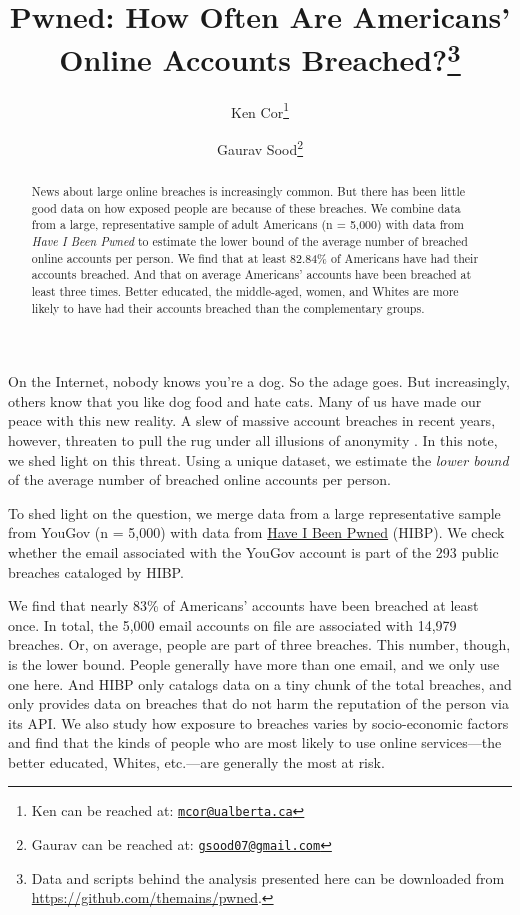 \documentclass[12pt, letterpaper]{article}
\title{Pwned: How Often Are Americans' Online Accounts Breached?\footnote{Data and scripts behind the analysis presented here can be downloaded from \url{https://github.com/themains/pwned}.
}}
\author{Ken Cor\thanks{Ken can be reached at: \href{mailto:mcor@ualberta.ca}{\texttt{mcor@ualberta.ca}}} \and Gaurav Sood\thanks{Gaurav can be reached at: \href{gsood07@gmail.com}{\texttt{gsood07@gmail.com}}}}
\begin{document}
\maketitle
\thispagestyle{empty}

\begin{abstract}
News about large online breaches is increasingly common. But there has been little good data on how exposed people are because of these breaches. We combine data from a large, representative sample of adult Americans (n = 5,000) with data from \textit{Have I Been Pwned} to estimate the lower bound of the average number of breached online accounts per person. We find that at least 82.84\% of Americans have had their accounts breached. And that on average Americans' accounts have been breached at least three times. Better educated, the middle-aged, women, and Whites are more likely to have had their accounts breached than the complementary groups.
\end{abstract}
\clearpage

\doublespacing

On the Internet, nobody knows you're a dog. So the adage goes. But increasingly, others know that you like dog food and hate cats. Many of us have made our peace with this new reality. A slew of massive account breaches in recent years, however, threaten to pull the rug under all illusions of anonymity \citep{mcandless}. In this note, we shed light on this threat. Using a unique dataset, we estimate the \textit{lower bound} of the average number of breached online accounts per person.

To shed light on the question, we merge data from a large representative sample from YouGov (n = 5,000) with data from \href{https://haveibeenpwned.com}{Have I Been Pwned} (HIBP). We check whether the email associated with the YouGov account is part of the 293 public breaches cataloged by HIBP.  

We find that nearly 83\% of Americans' accounts have been breached at least once. In total, the 5,000 email accounts on file are associated with 14,979 breaches. Or, on average, people are part of three breaches. This number, though, is the lower bound. People generally have more than one email, and we only use one here. And HIBP only catalogs data on a tiny chunk of the total breaches, and only provides data on breaches that do not harm the reputation of the person via its API.  We also study how exposure to breaches varies by socio-economic factors and find that the kinds of people who are most likely to use online services---the better educated, Whites, etc.---are generally the most at risk.
\end{document}
